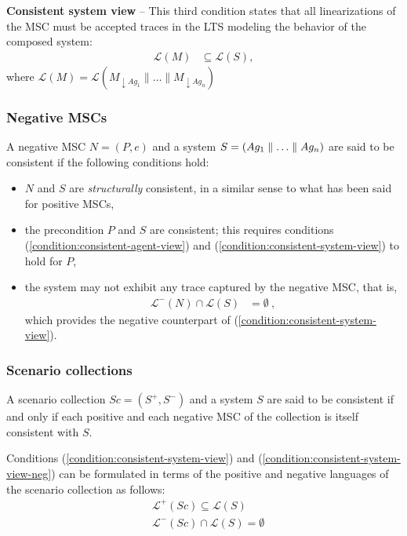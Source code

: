 \noindent \textbf{Consistent system view} -- This third condition states that all linearizations of the MSC must be accepted traces in the LTS modeling the behavior of the composed system:
\begin{align}\mathcal{L}(M) & \subseteq \mathcal{L}(S)\label{condition:consistent-system-view},\end{align}
where $\mathcal{L}(M) = \mathcal{L}(M_{\downarrow Ag_1} \parallel \ldots \parallel M_{\downarrow Ag_n})$

\subsubsection*{Negative MSCs}

A negative MSC $N = (P,e)$ and a system $S = (Ag_1 \parallel \ldots \parallel Ag_n)$ are said to be consistent if the following conditions hold:

\begin{itemize}
\item $N$ and $S$ are \emph{structurally} consistent, in a similar sense to what has been said for positive MSCs,

\item the precondition $P$ and $S$ are consistent; this requires conditions (\ref{condition:consistent-agent-view}) and (\ref{condition:consistent-system-view}) to hold for $P$,

\item the system may not exhibit any trace captured by the negative MSC, that is,
\begin{align}\mathcal{L}^{-}(N) \cap \mathcal{L}(S) &= \emptyset~,\label{condition:consistent-system-view-neg}\end{align}
which provides the negative counterpart of (\ref{condition:consistent-system-view}).
\end{itemize}

\subsubsection*{Scenario collections}

A scenario collection $Sc = (S^+,S^-)$ and a system $S$ are said to be consistent if and only if each positive and each negative MSC of the collection is itself consistent with $S$. 

Conditions (\ref{condition:consistent-system-view}) and (\ref{condition:consistent-system-view-neg}) can be formulated in terms of the positive and negative languages of the scenario collection as follows:
\begin{align}
&\mathcal{L}^+(Sc) \subseteq \mathcal{L}(S) \\
&\mathcal{L}^-(Sc) \cap \mathcal{L}(S) = \emptyset
\end{align}

